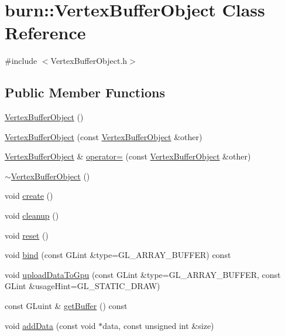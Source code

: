 \hypertarget{classburn_1_1_vertex_buffer_object}{\section{burn\-:\-:Vertex\-Buffer\-Object Class Reference}
\label{classburn_1_1_vertex_buffer_object}
}


{\ttfamily \#include $<$Vertex\-Buffer\-Object.\-h$>$}

\subsection*{Public Member Functions}
\begin{DoxyCompactItemize}
\item 
\hyperlink{classburn_1_1_vertex_buffer_object_af0a41c8a7971e0d1b3dae8627f62ff2d}{Vertex\-Buffer\-Object} ()
\item 
\hyperlink{classburn_1_1_vertex_buffer_object_a0928cc2ea2aadf3293b0a3bcd92357e3}{Vertex\-Buffer\-Object} (const \hyperlink{classburn_1_1_vertex_buffer_object}{Vertex\-Buffer\-Object} \&other)
\item 
\hyperlink{classburn_1_1_vertex_buffer_object}{Vertex\-Buffer\-Object} \& \hyperlink{classburn_1_1_vertex_buffer_object_a5eea02c5f9501b3f8701a1a74aef9de4}{operator=} (const \hyperlink{classburn_1_1_vertex_buffer_object}{Vertex\-Buffer\-Object} \&other)
\item 
\hyperlink{classburn_1_1_vertex_buffer_object_a6cf9484f38d9c22ecc4bed1c1ab2898f}{$\sim$\-Vertex\-Buffer\-Object} ()
\item 
void \hyperlink{classburn_1_1_vertex_buffer_object_aa419f6c9575373081db60a10f25ad8c3}{create} ()
\item 
void \hyperlink{classburn_1_1_vertex_buffer_object_a0345423ca4e50a58ecaf2521b5413a04}{cleanup} ()
\item 
void \hyperlink{classburn_1_1_vertex_buffer_object_a19f8dbad2ddb4bc1dcbbab1ddc717a4e}{reset} ()
\item 
void \hyperlink{classburn_1_1_vertex_buffer_object_a6e4741c78a4869248c51b616178efb1e}{bind} (const G\-Lint \&type=G\-L\-\_\-\-A\-R\-R\-A\-Y\-\_\-\-B\-U\-F\-F\-E\-R) const 
\item 
void \hyperlink{classburn_1_1_vertex_buffer_object_aedcb88f4ea35920ba42c035517dda014}{upload\-Data\-To\-Gpu} (const G\-Lint \&type=G\-L\-\_\-\-A\-R\-R\-A\-Y\-\_\-\-B\-U\-F\-F\-E\-R, const G\-Lint \&usage\-Hint=G\-L\-\_\-\-S\-T\-A\-T\-I\-C\-\_\-\-D\-R\-A\-W)
\item 
const G\-Luint \& \hyperlink{classburn_1_1_vertex_buffer_object_afa688bd32462da685a0d9363ebff96d6}{get\-Buffer} () const 
\item 
void \hyperlink{classburn_1_1_vertex_buffer_object_a675d7b4e12d35db7873d3f2c5400827a}{add\-Data} (const void $\ast$data, const unsigned int \&size)
\end{DoxyCompactItemize}
